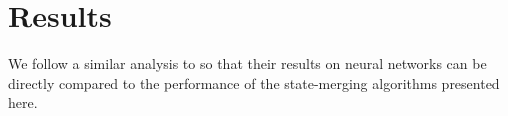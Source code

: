 \documentclass[twoside,11pt]{article}
\newcommand{\ttt}[1]{\texttt{#1}}
\newcommand{\tttx}[1]{\ttt{#1}\xspace}
\newcommand{\Alpha}{\tttx{Alph}}
\newcommand{\Tier}{\tttx{Tier}}
\newcommand{\Class}{\tttx{Class}}
\newcommand{\kay}{\tttx{k}}
\newcommand{\jay}{\tttx{j}}
\newcommand{\eye}{\tttx{i}}
\newcommand{\TrainSize}{\tttx{TrainSize}}
\newcommand{\TestType}{\tttx{TestType}}
\newcommand{\NNType}{\tttx{NNType}}
\begin{document}







\section{Results} \label{sec:results}
We follow a similar analysis to \citet{heinz-etal-2022-mlregtest} so that their results on neural networks can be directly compared to the performance of the state-merging algorithms presented here.
\end{document}
